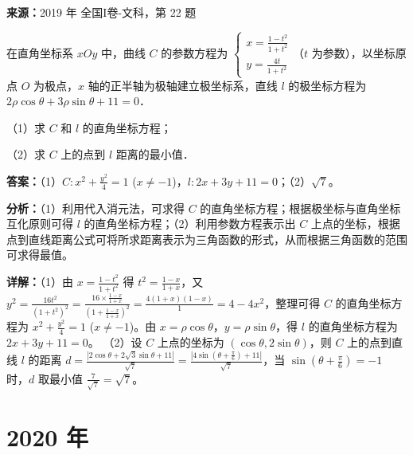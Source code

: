 \begin{question}[points=10]
\textbf{来源：}2019 年 全国I卷-文科，第 22 题\par
在直角坐标系 $xOy$ 中，曲线 $C$ 的参数方程为 $\begin{cases} x = \frac{1-t^2}{1+t^2} \\ y = \frac{4t}{1+t^2} \end{cases}$（$t$ 为参数），以坐标原点 $O$ 为极点，$x$ 轴的正半轴为极轴建立极坐标系，直线 $l$ 的极坐标方程为 $2\rho\cos\theta + 3\rho\sin\theta + 11 = 0$．

（1）求 $C$ 和 $l$ 的直角坐标方程；

（2）求 $C$ 上的点到 $l$ 距离的最小值．
\begin{solution}
\textbf{答案：}（1）$C: x^2 + \frac{y^2}{4} = 1$ ($x \neq -1$)，$l: 2x+3y+11=0$；（2）$\sqrt{7}$。

\textbf{分析：}（1）利用代入消元法，可求得 $C$ 的直角坐标方程；根据极坐标与直角坐标互化原则可得 $l$ 的直角坐标方程；（2）利用参数方程表示出 $C$ 上点的坐标，根据点到直线距离公式可将所求距离表示为三角函数的形式，从而根据三角函数的范围可求得最值。

\textbf{详解：}（1）由 $x = \frac{1-t^2}{1+t^2}$ 得 $t^2 = \frac{1-x}{1+x}$，又 $y^2 = \frac{16t^2}{(1+t^2)^2} = \frac{16 \times \frac{1-x}{1+x}}{(1+\frac{1-x}{1+x})^2} = \frac{4(1+x)(1-x)}{1} = 4-4x^2$，整理可得 $C$ 的直角坐标方程为 $x^2 + \frac{y^2}{4} = 1$ ($x \neq -1$)。由 $x=\rho\cos\theta$，$y=\rho\sin\theta$，得 $l$ 的直角坐标方程为 $2x+3y+11=0$。
（2）设 $C$ 上点的坐标为 $(\cos\theta, 2\sin\theta)$，则 $C$ 上的点到直线 $l$ 的距离 $d = \frac{|2\cos\theta + 2\sqrt{3}\sin\theta + 11|}{\sqrt{7}} = \frac{|4\sin(\theta+\frac{\pi}{6}) + 11|}{\sqrt{7}}$，当 $\sin(\theta+\frac{\pi}{6}) = -1$ 时，$d$ 取最小值 $\frac{7}{\sqrt{7}} = \sqrt{7}$。
\end{solution}
\end{question}

\section*{2020 年}

